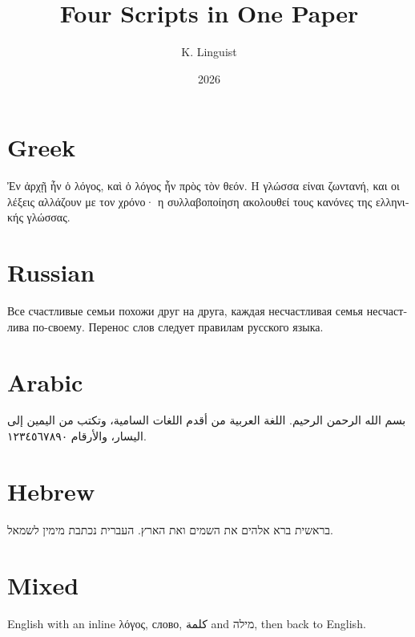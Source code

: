 \documentclass[11pt,a4paper]{article}
\title{Four Scripts in One Paper}
\author{K. Linguist}
\date{2026}
\begin{document}
\maketitle
\section{Greek}
\begin{greek}
Ἐν ἀρχῇ ἦν ὁ λόγος, καὶ ὁ λόγος ἦν πρὸς τὸν θεόν. Η γλώσσα είναι
ζωντανή, και οι λέξεις αλλάζουν με τον χρόνο· η συλλαβοποίηση ακολουθεί
τους κανόνες της ελληνικής γλώσσας.
\end{greek}
\section{Russian}
\begin{russian}
Все счастливые семьи похожи друг на друга, каждая несчастливая семья
несчастлива по-своему. Перенос слов следует правилам русского языка.
\end{russian}
\section{Arabic}
\begin{Arabic}
بسم الله الرحمن الرحيم. اللغة العربية من أقدم اللغات السامية، وتكتب من
اليمين إلى اليسار، والأرقام ١٢٣٤٥٦٧٨٩٠.
\end{Arabic}
\section{Hebrew}
\begin{hebrew}
בראשית ברא אלהים את השמים ואת הארץ. העברית נכתבת מימין לשמאל.
\end{hebrew}
\section{Mixed}
English with an inline \textgreek{λόγος}, \textrussian{слово},
\textarabic{كلمة} and \texthebrew{מילה}, then back to English.
\end{document}

